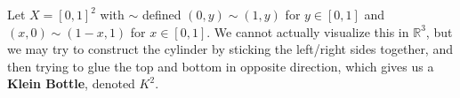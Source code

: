   \begin{example}
    Let $X = [0, 1]^2$ with $\sim$ defined $(0, y) \sim (1, y)$ for $y \in [0, 1]$ and $(x, 0) \sim (1 - x, 1)$ for $x \in [0, 1]$. We cannot actually visualize this in $\mathbb{R}^3$, but we may try to construct the cylinder by sticking the left/right sides together, and then trying to glue the top and bottom in opposite direction, which gives us a \textbf{Klein Bottle}, denoted $K^2$. 

    \begin{figure}[H]
      \centering
      \begin{subfigure}[b]{0.48\textwidth}
        \centering
\end{subfigure}
\end{figure}
\end{example}
